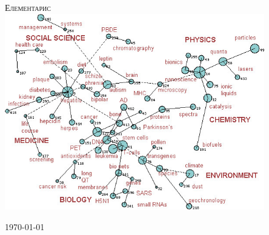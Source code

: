\begin{titlepage}
\begin{center}

\textsc{\Huge Елементарис}\\[1.5cm]
\includegraphics[width=0.85\textwidth]{../images/map-of-sciences}~
\\[1cm]

\vfill

\today

\end{center}
\end{titlepage}
